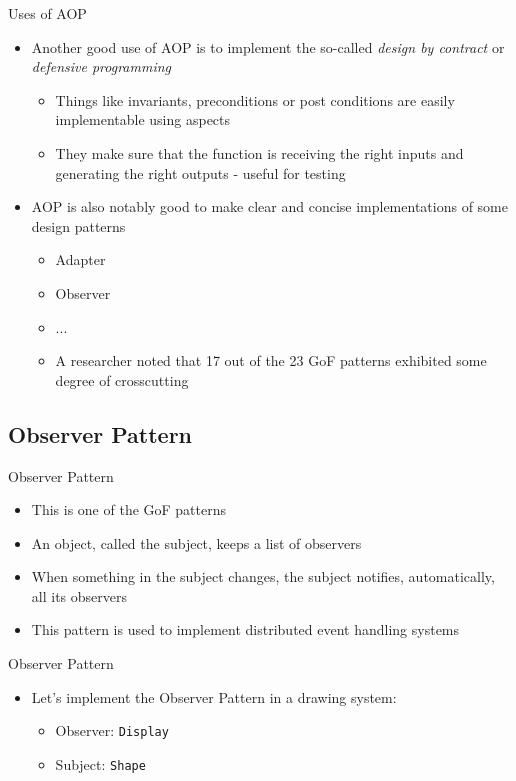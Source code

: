 \documentclass[11pt]{beamer}
\begin{document}
\begin{frame}{Uses of AOP}
\begin{itemize}
   \item Another good use of AOP is to implement the so-called \emph{design by contract} or \emph{defensive programming}
   \begin{itemize}
      \item Things like invariants, preconditions or post conditions are easily implementable using aspects
      \item They make sure that the function is receiving the right inputs and generating the right outputs - useful for testing
   \end{itemize}
   \item AOP is also notably good to make clear and concise implementations of some design patterns
      \begin{itemize}
         \item Adapter
         \item Observer
         \item ...
         \item A researcher noted that 17 out of the 23 GoF patterns exhibited some degree of crosscutting %
      \end{itemize}
\end{itemize}
\end{frame}



\subsection*{Observer Pattern}
\begin{frame}{Observer Pattern}
\begin{itemize}
   \item This is one of the GoF patterns
   \item An object, called the subject, keeps a list of observers
   \item When something in the subject changes, the subject notifies, automatically, all its observers
   \item This pattern is used to implement distributed event handling systems
\end{itemize}
\end{frame}

\begin{frame}{Observer Pattern}
\begin{itemize}
   \item Let's implement the Observer Pattern in a drawing system:
      \begin{itemize}
         \item Observer: \texttt{Display}
         \item Subject: \texttt{Shape}
      \end{itemize}
\end{itemize}
\end{frame}
\end{document}
